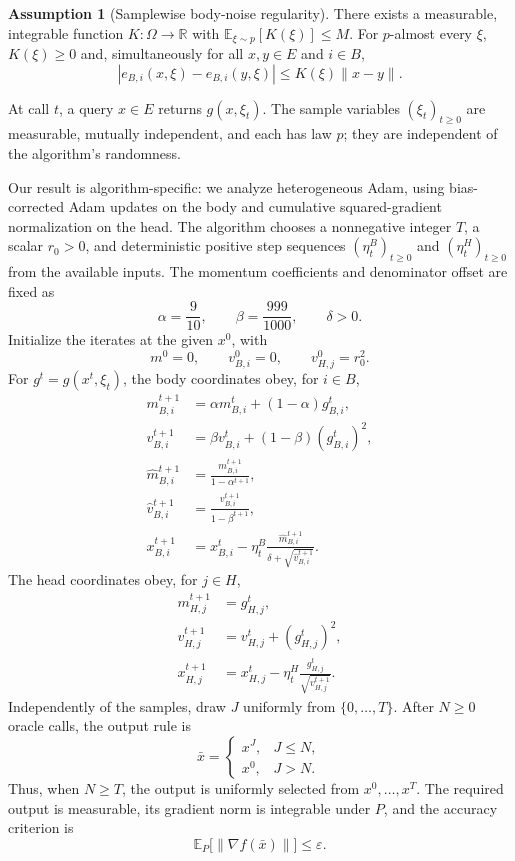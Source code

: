 \documentclass[10pt]{article}
\theoremstyle{definition}
\newtheorem{assumption}{Assumption}
\begin{document}
\begin{assumption}[Samplewise body-noise regularity]
There exists a measurable, integrable function $K:\Omega\to\mathbb{R}$ with $\mathbb{E}_{\xi\sim p}[K(\xi)]\leq M$. For $p$-almost every $\xi$, $K(\xi)\geq0$ and, simultaneously for all $x,y\in E$ and $i\in B$,
\[
|e_{B,i}(x,\xi)-e_{B,i}(y,\xi)|
\leq K(\xi)\|x-y\|.
\]
\end{assumption}

At call $t$, a query $x\in E$ returns $g(x,\xi_t)$. The sample variables $(\xi_t)_{t\geq0}$ are measurable, mutually independent, and each has law $p$; they are independent of the algorithm's randomness.

Our result is algorithm-specific: we analyze heterogeneous Adam, using bias-corrected Adam updates on the body and cumulative squared-gradient normalization on the head. The algorithm chooses a nonnegative integer $T$, a scalar $r_0>0$, and deterministic positive step sequences $(\eta^B_t)_{t\geq0}$ and $(\eta^H_t)_{t\geq0}$ from the available inputs. The momentum coefficients and denominator offset are fixed as
\[
\alpha=\frac{9}{10},\qquad
\beta=\frac{999}{1000},\qquad
\delta>0.
\]
Initialize the iterates at the given $x^0$, with
\[
m^0=0,\qquad v^0_{B,i}=0,\qquad v^0_{H,j}=r_0^2.
\]
For $g^t=g(x^t,\xi_t)$, the body coordinates obey, for $i\in B$,
\[
\begin{aligned}
m^{t+1}_{B,i}&=\alpha m^t_{B,i}+(1-\alpha)g^t_{B,i},\\
v^{t+1}_{B,i}&=\beta v^t_{B,i}+(1-\beta)(g^t_{B,i})^2,\\
\widehat m^{t+1}_{B,i}&=\frac{m^{t+1}_{B,i}}{1-\alpha^{t+1}},\\
\widehat v^{t+1}_{B,i}&=\frac{v^{t+1}_{B,i}}{1-\beta^{t+1}},\\
x^{t+1}_{B,i}&=x^t_{B,i}
-\eta^B_t\frac{\widehat m^{t+1}_{B,i}}
{\delta+\sqrt{\widehat v^{t+1}_{B,i}}}.
\end{aligned}
\]
The head coordinates obey, for $j\in H$,
\[
\begin{aligned}
m^{t+1}_{H,j}&=g^t_{H,j},\\
v^{t+1}_{H,j}&=v^t_{H,j}+(g^t_{H,j})^2,\\
x^{t+1}_{H,j}&=x^t_{H,j}
-\eta^H_t\frac{g^t_{H,j}}{\sqrt{v^{t+1}_{H,j}}}.
\end{aligned}
\]
Independently of the samples, draw $J$ uniformly from $\{0,\ldots,T\}$. After $N\geq0$ oracle calls, the output rule is
\[
\bar{x}=\begin{cases}
x^J,&J\leq N,\\
x^0,&J>N.
\end{cases}
\]
Thus, when $N\geq T$, the output is uniformly selected from $x^0,\ldots,x^T$. The required output is measurable, its gradient norm is integrable under $P$, and the accuracy criterion is
\[
\mathbb{E}_{P}\bigl[\|\nabla f(\bar{x})\|\bigr]\leq\varepsilon.
\]
\end{document}
